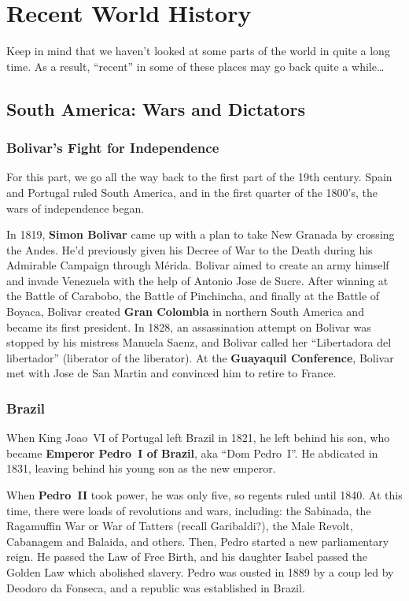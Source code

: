 \chapter{Recent World History}

Keep in mind that we haven't looked at some parts of the world in quite a long time.
As a result, ``recent'' in some of these places may go back quite a while\ldots{}

\section{South America: Wars and Dictators}

\subsection*{Bolivar's Fight for Independence}

For this part, we go all the way back to the first part of the 19th century.
Spain and Portugal ruled South America, and in the first quarter of the 1800's, the wars of independence began.

In 1819, \textbf{Simon Bolivar} came up with a plan to take New Granada by crossing the Andes.
He'd previously given his Decree of War to the Death during his Admirable Campaign through M\'erida.
Bolivar aimed to create an army himself and invade Venezuela with the help of Antonio Jose de Sucre.
After winning at the Battle of Carabobo, the Battle of Pinchincha, and finally at the Battle of Boyaca,
Bolivar created \textbf{Gran Colombia} in northern South America and became its first president.
In 1828, an assassination attempt on Bolivar was stopped by his mistress Manuela Saenz,
and Bolivar called her ``Libertadora del libertador'' (liberator of the liberator).
At the \textbf{Guayaquil Conference}, Bolivar met with Jose de San Martin and convinced him to retire to France.

\subsection*{Brazil}

When King Joao~VI of Portugal left Brazil in 1821, he left behind his son,
who became \textbf{Emperor Pedro~I of Brazil}, aka ``Dom Pedro~I''.
He abdicated in 1831, leaving behind his young son as the new emperor.

When \textbf{Pedro~II} took power, he was only five, so regents ruled until 1840.
At this time, there were loads of revolutions and wars, including:
the Sabinada,
the Ragamuffin War or War of Tatters (recall Garibaldi?),
the Male Revolt,
Cabanagem and Balaida,
and others.
Then, Pedro started a new parliamentary reign.
He passed the Law of Free Birth, and his daughter Isabel passed the Golden Law which abolished slavery.
Pedro was ousted in 1889 by a coup led by Deodoro da Fonseca, and a republic was established in Brazil.

